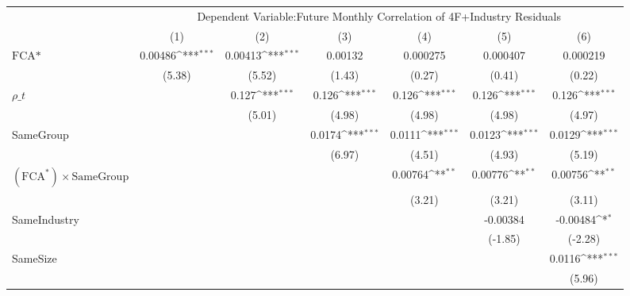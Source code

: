 {
\def\sym#1{\ifmmode^{#1}\else\(^{#1}\)\fi}
\begin{tabular}{l*{6}{c}}
\hline\hline
                &\multicolumn{6}{c}{Dependent Variable:Future Monthly Correlation of 4F+Industry Residuals}                       \\\cmidrule(lr){2-7}
                &\multicolumn{1}{c}{(1)}         &\multicolumn{1}{c}{(2)}         &\multicolumn{1}{c}{(3)}         &\multicolumn{1}{c}{(4)}         &\multicolumn{1}{c}{(5)}         &\multicolumn{1}{c}{(6)}         \\
\hline
$ \text{FCA*} $ &  0.00486\sym{***}&  0.00413\sym{***}&  0.00132         & 0.000275         & 0.000407         & 0.000219         \\
                &   (5.38)         &   (5.52)         &   (1.43)         &   (0.27)         &   (0.41)         &   (0.22)         \\
[1em]
 $ {\rho\_t} $   &                  &    0.127\sym{***}&    0.126\sym{***}&    0.126\sym{***}&    0.126\sym{***}&    0.126\sym{***}\\
                &                  &   (5.01)         &   (4.98)         &   (4.98)         &   (4.98)         &   (4.97)         \\
[1em]
SameGroup       &                  &                  &   0.0174\sym{***}&   0.0111\sym{***}&   0.0123\sym{***}&   0.0129\sym{***}\\
                &                  &                  &   (6.97)         &   (4.51)         &   (4.93)         &   (5.19)         \\
[1em]
 $ (\text{FCA}^*) \times {\text{SameGroup} }  $ &                  &                  &                  &  0.00764\sym{**} &  0.00776\sym{**} &  0.00756\sym{**} \\
                &                  &                  &                  &   (3.21)         &   (3.21)         &   (3.11)         \\
[1em]
SameIndustry    &                  &                  &                  &                  & -0.00384         & -0.00484\sym{*}  \\
                &                  &                  &                  &                  &  (-1.85)         &  (-2.28)         \\
[1em]
SameSize        &                  &                  &                  &                  &                  &   0.0116\sym{***}\\
                &                  &                  &                  &                  &                  &   (5.96)         \\

\end{tabular}}

